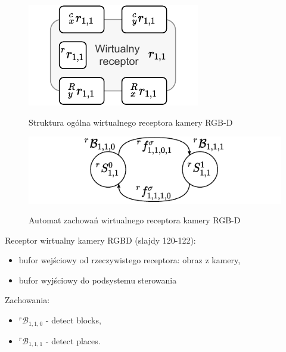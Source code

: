 \begin{figure}
    \centering
    \includegraphics[width=0.75\columnwidth]{figures/ISR-vr-camera-model.pdf}
    \label{fig:model-vr-camera}
    \caption{Struktura ogólna wirtualnego receptora kamery RGB-D}
\end{figure}

\begin{figure}
    \centering
    \includegraphics[width=\columnwidth]{figures/ISR-vr-camera-behaviours.pdf}
    \label{fig:zachowania-vr-camera}
    \caption{Automat zachowań wirtualnego receptora kamery RGB-D}
\end{figure}

Receptor wirtualny kamery RGBD (slajdy 120-122):
\begin{itemize}
    \item bufor wejściowy od rzeczywistego receptora: obraz z kamery,
    \item bufor wyjściowy do podsystemu sterowania
\end{itemize}


Zachowania:
\begin{itemize}
    \item ${}^{r}\mathcal{B}_{1,1,0}$ - detect blocks,
    \item ${}^{r}\mathcal{B}_{1,1,1}$ - detect places.
\end{itemize}